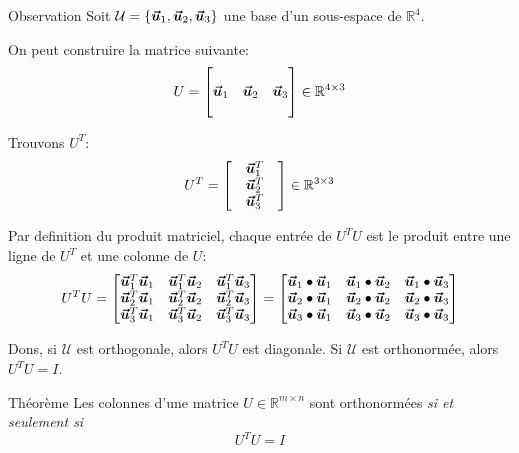 \documentclass[a4paper]{article}
\begin{document}
\begin{parag}{Observation}
    Soit $\mathcal{U} = \left\{\bvec{u}_1, \bvec{u}_2, \bvec{u}_3\right\}$ une base d'un sous-espace de $\mathbb{R}^4$.

    On peut construire la matrice suivante:
    \[U = \begin{bmatrix}  &  &  \\ \bm{\protect\vec{u}}_1 & \bm{\protect\vec{u}}_2 & \bm{\protect\vec{u}}_3 \\  &  &  \end{bmatrix} \in \mathbb{R}^{4 \times 3}\]

    Trouvons $U^T$:
    \[U^T = \begin{bmatrix}  & \bm{\protect\vec{u}}_1^T &  \\  & \bm{\protect\vec{u}}_2^T &  \\  & \bm{\protect\vec{u}}_3^T &  \end{bmatrix} \in \mathbb{R}^{3 \times 3}\]

    Par definition du produit matriciel, chaque entrée de $U^T U$ est le produit entre une ligne de $U^T$ et une colonne de $U$:
    \[U^T U = \begin{bmatrix} \bm{\protect\vec{u}}_1^T \bm{\protect\vec{u}}_1 & \bm{\protect\vec{u}}_1^T \bm{\protect\vec{u}}_2 & \bm{\protect\vec{u}}_1^T \bm{\protect\vec{u}}_3 \\ \bm{\protect\vec{u}}_2^T \bm{\protect\vec{u}}_1 & \bm{\protect\vec{u}}_2^T \bm{\protect\vec{u}}_2 & \bm{\protect\vec{u}}_2^T \bm{\protect\vec{u}}_3 \\ \bm{\protect\vec{u}}_3^T \bm{\protect\vec{u}}_1 & \bm{\protect\vec{u}}_3^T \bm{\protect\vec{u}}_2 & \bm{\protect\vec{u}}_3^T \bm{\protect\vec{u}}_3 \end{bmatrix} = \begin{bmatrix} \bm{\protect\vec{u}}_1 \bullet \bm{\protect\vec{u}}_1 & \bm{\protect\vec{u}}_1 \bullet \bm{\protect\vec{u}}_2 & \bm{\protect\vec{u}}_1 \bullet \bm{\protect\vec{u}}_3 \\ \bm{\protect\vec{u}}_2 \bullet \bm{\protect\vec{u}}_1 & \bm{\protect\vec{u}}_2 \bullet \bm{\protect\vec{u}}_2 & \bm{\protect\vec{u}}_2 \bullet \bm{\protect\vec{u}}_3 \\ \bm{\protect\vec{u}}_3 \bullet \bm{\protect\vec{u}}_1 & \bm{\protect\vec{u}}_3 \bullet \bm{\protect\vec{u}}_2 & \bm{\protect\vec{u}}_3 \bullet \bm{\protect\vec{u}}_3 \end{bmatrix}  \]

    Dons, si $\mathcal{U}$ est orthogonale, alors $U^T U$ est diagonale. Si $\mathcal{U}$ est orthonormée, alors $U^T U = I$.
\end{parag}

\begin{parag}{Théorème}
    Les colonnes d'une matrice $U \in \mathbb{R}^{m \times n}$ sont orthonormées \textit{si et seulement si}
    \[U^T U = I\]
\end{parag}
\end{document}
